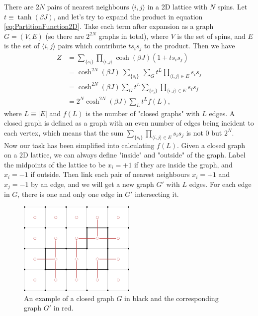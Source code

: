 \documentclass[11pt]{article}
\begin{document}
	There are $2N$ pairs of nearest neighbours $\langle i,j \rangle$ in a 2D lattice with $N$ spins. Let $t \equiv \tanh(\beta J)$, and let's try to expand the product in equation \eqref{eq:PartitionFunction2D}. Take each term after expansion as a graph $G = (V, E)$ (so there are $2^{2N}$ graphs in total), where $V$ is the set of spins, and $E$ is the set of $\langle i,j \rangle$ pairs which contribute $t s_i s_j$ to the product. Then we have
	\begin{equation} \label{eq:PartitionFunction2DTransformed}
		\begin{aligned}
			Z &= \sum_{\{s_i\}} \prod_{\langle i,j \rangle} \cosh(\beta J)(1 + t s_i s_j) \\
			&= \cosh^{2N}(\beta J)\ \sum_{\{s_i\}}\ \sum_G t^L \prod_{\langle i,j \rangle \in E} s_i s_j \\
			&= \cosh^{2N}(\beta J) \sum_{G} t^L \sum_{\{s_i\}} \prod_{\langle i,j \rangle \in E} s_i s_j \\
			&= 2^N \cosh^{2N}(\beta J) \sum_{L} t^{L} f(L),
		\end{aligned}
	\end{equation}
	where $L \equiv |E|$ and $f(L)$ is the number of "closed graphs" with $L$ edges. A closed graph is defined as a graph with an even number of edges being incident to each vertex, which means that the sum $\displaystyle\sum_{\{s_i\}} \prod_{\langle i,j \rangle \in E} s_i s_j$ is not $0$ but $2^N$.\\

	Now our task has been simplified into calculating $f(L)$. Given a closed graph on a 2D lattice, we can always define "inside" and "outside" of the graph. Label the midpoints of the lattice to be $x_i=+1$ if they are inside the graph, and $x_i=-1$ if outside. Then link each pair of nearest neighbours $x_i=+1$ and $x_j=-1$ by an edge, and we will get a new graph $G'$ with $L$ edges. For each edge in $G$, there is one and only one edge in $G'$ intersecting it.

	\begin{figure}[H]
		\begin{center}
			\includegraphics[width=0.5\textwidth]{./img/ising-graph.png}
		\end{center}
		\caption{An example of a closed graph $G$ in black and the corresponding graph $G'$ in red.}
		\label{fig:ising_graph}
	\end{figure}
\end{document}
